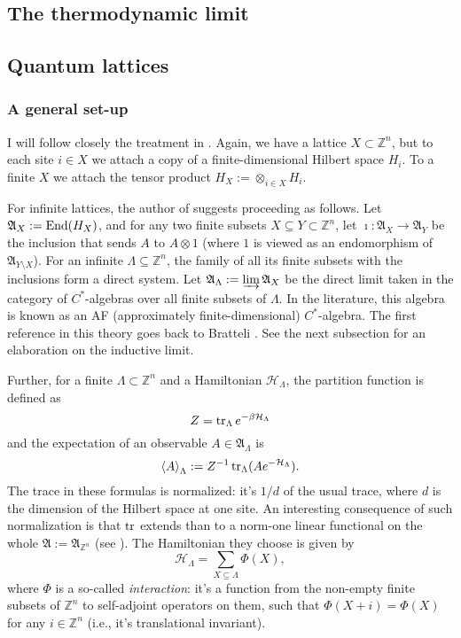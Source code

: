 \subsection{The thermodynamic limit}

\subsection{Quantum lattices}
\subsubsection{A general set-up}
I will follow closely the treatment in \cite{israel}. Again, we have a lattice $X \subset \mathbb Z^n$, but to each site $i \in X$ we attach a copy of a finite-dimensional Hilbert space $H_i$. To a finite $X$ we attach the tensor product $H_X := \otimes_{i \in X} H_i$. %

For infinite lattices, the author of \cite{israel} suggests proceeding as follows. Let $\mathfrak{A}_X := \operatorname{End}(H_X)$, and for any two finite subsets $X \subseteq Y \subset \mathbb Z^n$, let $\imath : \mathfrak{A}_X \rightarrow \mathfrak{A}_Y$ be the inclusion that sends $A$ to $A \otimes 1$ (where $1$ is viewed as an endomorphism of $\mathfrak{A}_{Y\setminus X}$). For an infinite $\Lambda \subseteq \mathbb Z^n$, the family of all its finite subsets with the inclusions form a direct system. Let $\mathfrak A_{\Lambda} := \varinjlim \mathfrak{A}_X$ be the direct limit taken in the category of $C^*$-algebras over all finite subsets of $\Lambda$. In the literature, this algebra is known as an AF (approximately finite-dimensional) $C^*$-algebra. The first reference in this theory goes back to Bratteli \cite{bratteli}. See the next subsection for an elaboration on the inductive limit.

Further, for a finite $\Lambda \subset \mathbb Z^n$ and a Hamiltonian $\mathcal H_{\Lambda}$, the partition function is defined as
\[
Z = \operatorname{tr}_{\Lambda} e^{-\beta \mathcal H_{\Lambda}}
\]
and the expectation of an observable $A \in \mathfrak A_{\Lambda}$ is 
\[
\left\langle A \right\rangle_{\Lambda} := Z^{-1} \operatorname{tr}_{\Lambda} (A e^{-\mathcal H_{\Lambda}}).
\]
The trace in these formulas is normalized: it's $1/d$ of the usual trace, where $d$ is the dimension of the Hilbert space at one site. An interesting consequence of such normalization is that $\operatorname{tr}$ extends than to a norm-one linear functional on the whole $\mathfrak A:= \mathfrak A_{\mathbb Z^n}$ (see \cite{israel}). The Hamiltonian they choose is given by
\[
\mathcal H_{\Lambda} = \sum_{X \subseteq \Lambda} \Phi(X),
\]
where $\Phi$ is a so-called \emph{interaction}: it's a function from the non-empty finite subsets of $\mathbb Z^n$ to self-adjoint operators on them, such that $\Phi(X+i) = \Phi(X)$ for any $i \in \mathbb Z^n$ (i.e., it's translational invariant).

